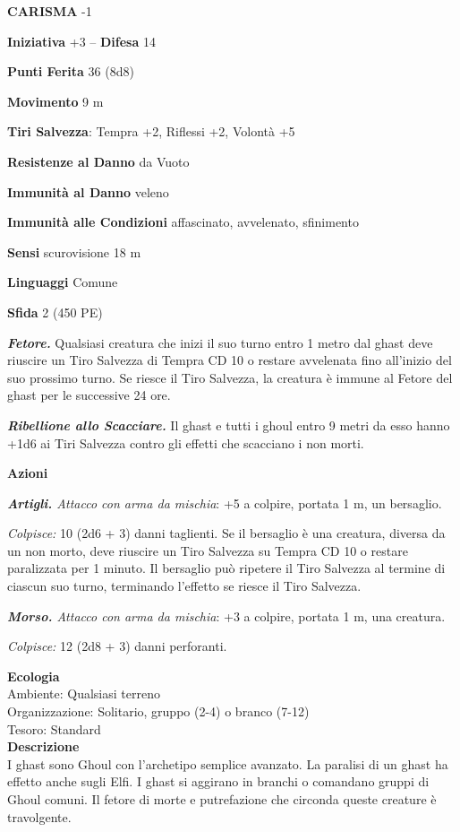 \begin{multicols}{2}
\textbf{CARISMA} -1

\textbf{Iniziativa} +3 -- \textbf{Difesa} 14

\textbf{Punti Ferita} 36 (8d8)

\textbf{Movimento} 9 m

\textbf{Tiri Salvezza}: Tempra +2, Riflessi +2, Volontà +5

\textbf{Resistenze al Danno} da Vuoto

\textbf{Immunità al Danno} veleno

\textbf{Immunità alle Condizioni} affascinato, avvelenato, sfinimento

\textbf{Sensi} scurovisione 18 m

\textbf{Linguaggi} Comune

\textbf{Sfida} 2 (450 PE)

\emph{\textbf{Fetore.}} Qualsiasi creatura che inizi il suo turno entro 1 metro dal ghast deve riuscire un Tiro Salvezza di Tempra CD 10 o restare avvelenata fino all'inizio del suo prossimo turno. Se riesce il Tiro Salvezza, la creatura è immune al Fetore del ghast per le successive 24
ore.

\emph{\textbf{Ribellione allo Scacciare.}} Il ghast e tutti i ghoul entro 9 metri da esso hanno +1d6 ai Tiri Salvezza contro gli effetti che scacciano i non morti.

\textbf{Azioni}

\emph{\textbf{Artigli.} Attacco con arma da mischia}: +5 a colpire, portata 1 m, un bersaglio.

\emph{Colpisce:} 10 (2d6 + 3) danni taglienti. Se il bersaglio è una creatura, diversa da un non morto, deve riuscire un Tiro Salvezza su Tempra CD 10 o restare paralizzata per 1 minuto. Il bersaglio può ripetere il Tiro Salvezza al termine di ciascun suo turno, terminando l'effetto se riesce il Tiro Salvezza. 

\emph{\textbf{Morso.} Attacco con arma da mischia}: +3 a colpire, portata 1 m, una creatura.

\emph{Colpisce:} 12 (2d8 + 3) danni perforanti.

\textbf{Ecologia}\\
Ambiente: Qualsiasi terreno\\
Organizzazione: Solitario, gruppo (2-4) o branco (7-12)\\
Tesoro: Standard\\
\textbf{Descrizione}\\
I ghast sono Ghoul con l'archetipo semplice avanzato. La paralisi di un ghast ha effetto anche sugli Elfi. I ghast si aggirano in branchi o comandano gruppi di Ghoul comuni. Il fetore di morte e putrefazione che circonda queste creature è travolgente.\\



\end{multicols}

